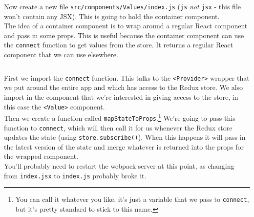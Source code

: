 Now create a new file \texttt{src/components/Values/index.js} (\texttt{js} \textit{not} \texttt{jsx} - this file won't contain any JSX). This is going to hold the container component.
\\

The idea of a container component is to wrap around a regular React component and pass in some props. This is useful because the container component can use the \texttt{connect} function to get values from the store. It returns a regular React component that we can use elsewhere.

\inputminted{jsx}{02/figures/02/04-Value-index.js}

First we import the \texttt{connect} function. This talks to the \texttt{<Provider>} wrapper that we put around the entire app and which has access to the Redux store. We also import in the component that we're interested in giving access to the store, in this case the \texttt{<Value>} component.
\\

Then we create a function called \texttt{mapStateToProps}.\footnote{You can call it whatever you like, it's just a variable that we pass to \texttt{connect}, but it's pretty standard to stick to this name.} We're going to pass this function to \texttt{connect}, which will then call it for us whenever the Redux store updates the state (using \texttt{store.subscribe()}). When this happens it will pass in the latest version of the state and merge whatever is returned into the props for the wrapped component.
\\

You'll probably need to restart the webpack server at this point, as changing from \texttt{index.jsx} to \texttt{index.js} probably broke it.


\par\bigskip


\pagebreak

